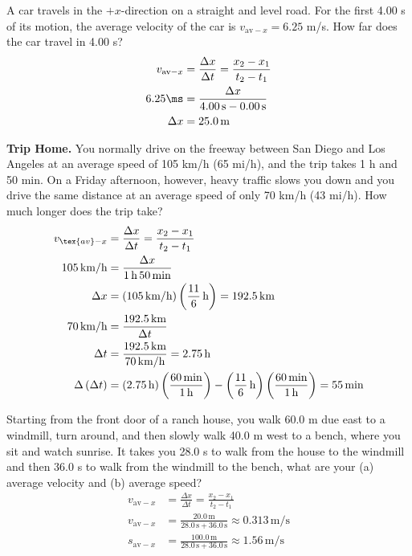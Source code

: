 \documentclass[12pt]{article}
\newenvironment{problem}[2][]{
    \begin{trivlist}
        \item[
            {\bfseries #1}
            {\bfseries #2}
        ]
}{\end{trivlist}}
\newcommand{\unit}[1]{\, \text{#1}}
\newcommand{\m}{\unit{m}}
\newcommand{\km}{\unit{km}}
\newcommand{\kmh}{\unit{km/h}}
\newcommand{\mps}{\unit{m/s}}
\newcommand{\s}{\unit{s}}
\begin{document}
\begin{problem}{2.1}
    A car travels in the $+x$-direction on a straight and level road. For the first 4.00 s of its motion, the average velocity of the car is $v_{\text{av}-x} = 6.25$ m/s. How far does the car travel in 4.00 s?
    \begin{align}
        v_{\text{av}-x} &= \frac{\Delta x}{\Delta t} = \frac{x_2 - x_1}{t_2 - t_1} \\
        6.25 \ms &= \frac{\Delta x}{4.00 \s - 0.00 \s} \\
        \Delta x &= 25.0 \m
    \end{align}
\end{problem}

\begin{problem}{2.3}
    \textbf{Trip Home.} You normally drive on the freeway between San Diego and Los Angeles at an average speed of 105 km/h (65 mi/h), and the trip takes 1 h and 50 min. On a Friday afternoon, however, heavy traffic slows you down and you drive the same distance at an average speed of only 70 km/h (43 mi/h). How much longer does the trip take?
    \begin{align}
        v_{\tex{av}-x} &= \frac{\Delta x}{\Delta t} = \frac{x_2 - x_1}{t_2 - t_1} \\
        105 \kmh &= \frac{\Delta x}{1 \unit{h} \, 50 \min} \\
        \Delta x &= \left(105 \kmh\right) \left(\frac{11}{6} \unit{h}\right) = 192.5 \km\\
        70 \kmh &= \frac{192.5 \km}{\Delta t} \\
        \Delta t &= \frac{192.5 \km}{70 \kmh} = 2.75 \unit{h} \\
        \Delta\left(\Delta t\right) &= \left(2.75 \unit{h}\right) \left(\frac{60 \min}{1 \unit{h}}\right) - \left(\frac{11}{6} \unit{h}\right)\left(\frac{60 \min}{1 \unit{h}}\right) = 55 \min
    \end{align}
\end{problem}

\begin{problem}{2.5}
    Starting from the front door of a ranch house, you walk 60.0 m due east to a windmill, turn around, and then slowly walk 40.0 m west to a bench, where you sit and watch sunrise. It takes you 28.0 s to walk from the house to the windmill and then 36.0 s to walk from the windmill to the bench, what are your (a) average velocity and (b) average speed?
    \begin{align}
        v_{\text{av}-x} &= \frac{\Delta x}{\Delta t} = \frac{x_2 - x_1}{t_2 - t_1} \\
        v_{\text{av}-x} &= \frac{20.0 \m}{28.0 \s + 36.0 \s} \approx 0.313 \mps \\
        s_{\text{av}-x} &= \frac{100.0 \m}{28.0 \s + 36.0 \s} \approx 1.56 \mps
    \end{align}
\end{problem}
\end{document}
